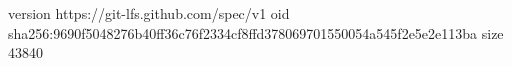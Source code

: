 version https://git-lfs.github.com/spec/v1
oid sha256:9690f5048276b40ff36c76f2334cf8ffd378069701550054a545f2e5e2e113ba
size 43840
